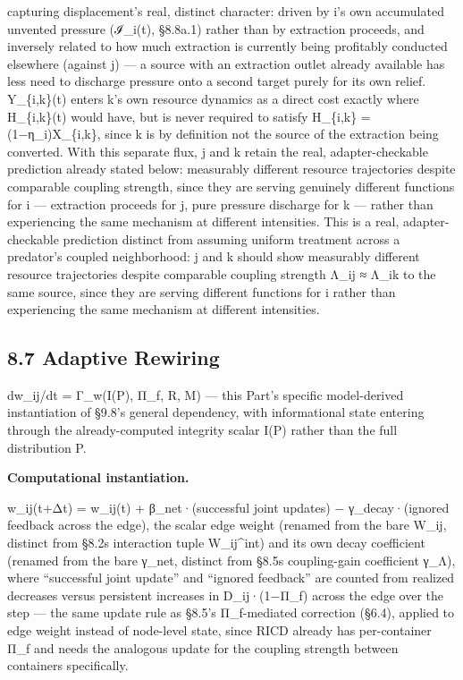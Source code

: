 \documentclass[
]{article}
\begin{document}
capturing displacement's real, distinct character: driven by i's own
accumulated unvented pressure (ℐ\_i(t), §8.8a.1) rather than by
extraction proceeds, and inversely related to how much extraction is
currently being profitably conducted elsewhere (against j) --- a source
with an extraction outlet already available has less need to discharge
pressure onto a second target purely for its own relief. Y\_\{i,k\}(t)
enters k's own resource dynamics as a direct cost exactly where
H\_\{i,k\}(t) would have, but is never required to satisfy H\_\{i,k\} =
(1−η\_i)X\_\{i,k\}, since k is by definition not the source of the
extraction being converted. With this separate flux, j and k retain the
real, adapter-checkable prediction already stated below: measurably
different resource trajectories despite comparable coupling strength,
since they are serving genuinely different functions for i ---
extraction proceeds for j, pure pressure discharge for k --- rather than
experiencing the same mechanism at different intensities. This is a
real, adapter-checkable prediction distinct from assuming uniform
treatment across a predator's coupled neighborhood: j and k should show
measurably different resource trajectories despite comparable coupling
strength Λ\_ij ≈ Λ\_ik to the same source, since they are serving
different functions for i rather than experiencing the same mechanism at
different intensities.

\hypertarget{adaptive-rewiring}{%
\subsection{8.7 Adaptive Rewiring}\label{adaptive-rewiring}}

dw\_ij/dt = Γ\_w(I(P), Π\_f, R, M) --- this Part's specific
model-derived instantiation of §9.8's general dependency, with
informational state entering through the already-computed integrity
scalar I(P) rather than the full distribution P.

\textbf{Computational instantiation.}

w\_ij(t+Δt) = w\_ij(t) + β\_net·(successful joint updates) −
γ\_decay·(ignored feedback across the edge), the scalar edge weight
(renamed from the bare W\_ij, distinct from §8.2s interaction tuple
W\_ij\^{}int) and its own decay coefficient (renamed from the bare
γ\_net, distinct from §8.5s coupling-gain coefficient γ\_Λ), where
``successful joint update'' and ``ignored feedback'' are counted from
realized decreases versus persistent increases in D\_ij·(1−Π\_f) across
the edge over the step --- the same update rule as §8.5's Π\_f-mediated
correction (§6.4), applied to edge weight instead of node-level state,
since RICD already has per-container Π\_f and needs the analogous update
for the coupling strength between containers specifically.
\end{document}
